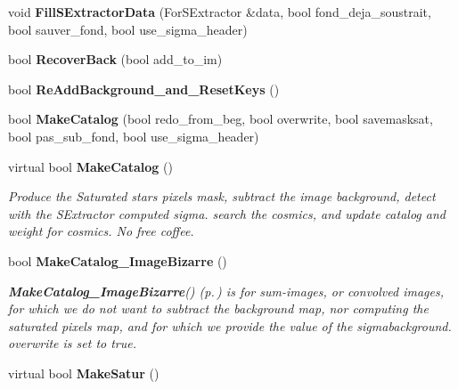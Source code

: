 \begin{CompactItemize}
\item 
{}
void {\bf Fill\-SExtractor\-Data} (For\-SExtractor \&data, bool fond\_\-deja\_\-soustrait, bool sauver\_\-fond, bool use\_\-sigma\_\-header)\label{class_reducedimage_a17}

\item 
{}
bool {\bf Recover\-Back} (bool add\_\-to\_\-im)\label{class_reducedimage_a18}

\item 
{}
bool {\bf Re\-Add\-Background\_\-and\_\-Reset\-Keys} ()\label{class_reducedimage_a19}

\item 
{}
bool {\bf Make\-Catalog} (bool redo\_\-from\_\-beg, bool overwrite, bool savemasksat, bool pas\_\-sub\_\-fond, bool use\_\-sigma\_\-header)\label{class_reducedimage_a20}

\item 
{}
virtual bool {\bf Make\-Catalog} ()\label{class_reducedimage_a21}

\begin{CompactList}\small\item\em Produce the Saturated stars pixels mask, subtract the image background, detect with the SExtractor computed sigma. search the cosmics, and update catalog and weight for cosmics. No free coffee.\item\end{CompactList}\item 
{}
bool {\bf Make\-Catalog\_\-Image\-Bizarre} ()\label{class_reducedimage_a22}

\begin{CompactList}\small\item\em {\bf Make\-Catalog\_\-Image\-Bizarre}() {\rm (p.\,\pageref{class_reducedimage_a22})} is for sum-images, or convolved images, for which we do not want to subtract the background map, nor computing the saturated pixels map, and for which we provide the value of the sigmabackground. overwrite is set to true.\item\end{CompactList}\item 
{}
virtual bool {\bf Make\-Satur} ()\label{class_reducedimage_a23}


\end{CompactItemize}
